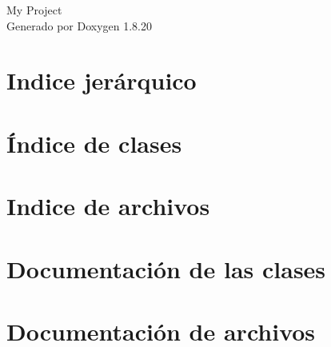 \let\mypdfximage\pdfximage\def\pdfximage{\immediate\mypdfximage}\documentclass[twoside]{book}
\newcommand{\+}{\discretionary{\mbox{\scriptsize$\hookleftarrow$}}{}{}}
\newcommand{\clearemptydoublepage}{%
  \newpage{\pagestyle{empty}\cleardoublepage}%
}
\begin{document}
\hypersetup{pageanchor=false,
             bookmarksnumbered=true,
             pdfencoding=unicode
            }
\begin{titlepage}
\vspace*{7cm}
\begin{center}%
{\Large My Project }\\
\vspace*{1cm}
{\large Generado por Doxygen 1.8.20}\\
\end{center}
\end{titlepage}
\clearemptydoublepage
{}
\tableofcontents
\clearemptydoublepage
{}
\hypersetup{pageanchor=true}

\chapter{Indice jerárquico}

\chapter{Índice de clases}

\chapter{Indice de archivos}

\chapter{Documentación de las clases}













\chapter{Documentación de archivos}














\backmatter
\newpage
{}
\clearemptydoublepage
{}
\printindex
\end{document}
